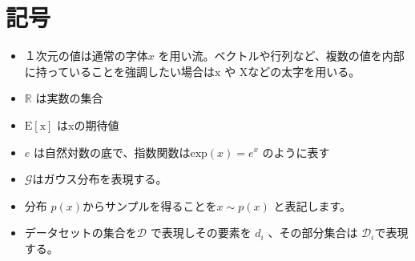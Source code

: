 \chapter*{記号}
\label{thanks}


\begin{itemize}
    \item １次元の値は通常の字体$ x $ を用い流。ベクトルや行列など、複数の値を内部に持っていることを強調したい場合は$ \mathrm{x} $ や $ \mathrm{X} $などの太字を用いる。
    \item $\mathbb{R}$ は実数の集合
    \item $\mathrm{E[x]}$ はxの期待値
    \item $e$ は自然対数の底で、指数関数は$\mathrm{exp}(x) = e^x$ のように表す
    \item $ \mathcal{G} $はガウス分布を表現する。
    \item 分布 $p(x)$からサンプルを得ることを$ x \sim p(x) $ と表記します。
    \item データセットの集合を$ \mathcal{D} $ で表現しその要素を $ d_i $ 、その部分集合は $ \mathcal{D}_i $で表現する。

\end{itemize}